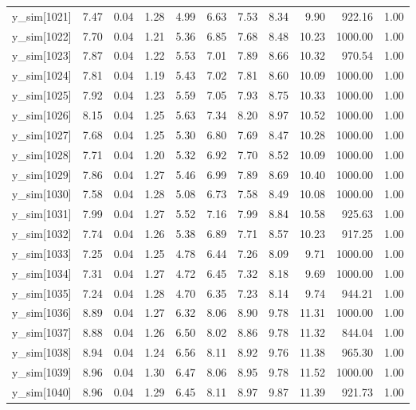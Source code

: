 \begin{table}[ht]
\begin{tabular}{rrrrrrrrrrr}
  y\_sim[1021] & 7.47 & 0.04 & 1.28 & 4.99 & 6.63 & 7.53 & 8.34 & 9.90 & 922.16 & 1.00 \\ 
  y\_sim[1022] & 7.70 & 0.04 & 1.21 & 5.36 & 6.85 & 7.68 & 8.48 & 10.23 & 1000.00 & 1.00 \\ 
  y\_sim[1023] & 7.87 & 0.04 & 1.22 & 5.53 & 7.01 & 7.89 & 8.66 & 10.32 & 970.54 & 1.00 \\ 
  y\_sim[1024] & 7.81 & 0.04 & 1.19 & 5.43 & 7.02 & 7.81 & 8.60 & 10.09 & 1000.00 & 1.00 \\ 
  y\_sim[1025] & 7.92 & 0.04 & 1.23 & 5.59 & 7.05 & 7.93 & 8.75 & 10.33 & 1000.00 & 1.00 \\ 
  y\_sim[1026] & 8.15 & 0.04 & 1.25 & 5.63 & 7.34 & 8.20 & 8.97 & 10.52 & 1000.00 & 1.00 \\ 
  y\_sim[1027] & 7.68 & 0.04 & 1.25 & 5.30 & 6.80 & 7.69 & 8.47 & 10.28 & 1000.00 & 1.00 \\ 
  y\_sim[1028] & 7.71 & 0.04 & 1.20 & 5.32 & 6.92 & 7.70 & 8.52 & 10.09 & 1000.00 & 1.00 \\ 
  y\_sim[1029] & 7.86 & 0.04 & 1.27 & 5.46 & 6.99 & 7.89 & 8.69 & 10.40 & 1000.00 & 1.00 \\ 
  y\_sim[1030] & 7.58 & 0.04 & 1.28 & 5.08 & 6.73 & 7.58 & 8.49 & 10.08 & 1000.00 & 1.00 \\ 
  y\_sim[1031] & 7.99 & 0.04 & 1.27 & 5.52 & 7.16 & 7.99 & 8.84 & 10.58 & 925.63 & 1.00 \\ 
  y\_sim[1032] & 7.74 & 0.04 & 1.26 & 5.38 & 6.89 & 7.71 & 8.57 & 10.23 & 917.25 & 1.00 \\ 
  y\_sim[1033] & 7.25 & 0.04 & 1.25 & 4.78 & 6.44 & 7.26 & 8.09 & 9.71 & 1000.00 & 1.00 \\ 
  y\_sim[1034] & 7.31 & 0.04 & 1.27 & 4.72 & 6.45 & 7.32 & 8.18 & 9.69 & 1000.00 & 1.00 \\ 
  y\_sim[1035] & 7.24 & 0.04 & 1.28 & 4.70 & 6.35 & 7.23 & 8.14 & 9.74 & 944.21 & 1.00 \\ 
  y\_sim[1036] & 8.89 & 0.04 & 1.27 & 6.32 & 8.06 & 8.90 & 9.78 & 11.31 & 1000.00 & 1.00 \\ 
  y\_sim[1037] & 8.88 & 0.04 & 1.26 & 6.50 & 8.02 & 8.86 & 9.78 & 11.32 & 844.04 & 1.00 \\ 
  y\_sim[1038] & 8.94 & 0.04 & 1.24 & 6.56 & 8.11 & 8.92 & 9.76 & 11.38 & 965.30 & 1.00 \\ 
  y\_sim[1039] & 8.96 & 0.04 & 1.30 & 6.47 & 8.06 & 8.95 & 9.78 & 11.52 & 1000.00 & 1.00 \\ 
  y\_sim[1040] & 8.96 & 0.04 & 1.29 & 6.45 & 8.11 & 8.97 & 9.87 & 11.39 & 921.73 & 1.00 \\ 

\end{tabular}
\end{table}
